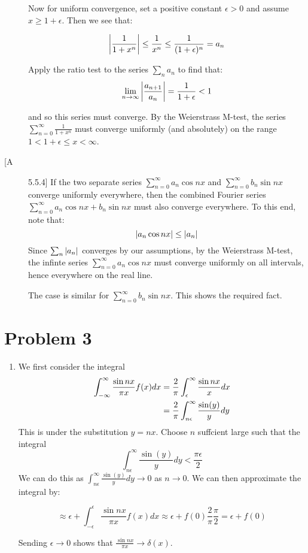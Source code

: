 \documentclass[12pt]{article}%
\newcommand{\infsum}[1][0]{\sum^{\infty}_{n = {#1}}}
\newcommand{\posinfint}[1][0]{\int_{#1}^\infty}
\begin{document}
\begin{description}
  Now for uniform convergence, set a positive constant $\epsilon > 0$ and assume $x \geq 1 + \epsilon$. Then we see that:

  \begin{equation*}
    \abs{\frac{1}{1 + x^n}} \leq \frac{1}{x^n} \leq \frac{1}{(1 + \epsilon)^n} = a_n
  \end{equation*}

  Apply the ratio test to the series $\sum_n a_n$ to find that:
  \begin{equation*}
    \lim_{n \rightarrow \infty} \abs{\frac{a_{n+1}}{a_n}} = \frac{1}{1  + \epsilon} < 1
  \end{equation*}

  and so this series must converge. By the Weierstrass M-test, the series $\infsum \frac{1}{1 + x^n}$ must converge uniformly (and absolutely) on the range $1 < 1 + \epsilon \leq x < \infty$.

  \item[[A] 5.5.4]
  If the two separate series $\infsum[0] a_n \cos{nx}$ and $\infsum b_n \sin{nx}$ converge uniformly everywhere, then the combined Fourier series $\infsum[0] a_n \cos{nx} + b_n \sin{nx}$ must also converge everywhere. To this end, note that: \[ \abs{a_n \cos{nx}} \leq \abs{a_n} \] Since $\sum_n \abs{a_n}$ converges by our assumptions, by the Weierstrass M-test, the infinte series $\infsum[0] a_n \cos{nx}$ must converge uniformly on all intervals, hence everywhere on the real line.

  The case is similar for $\infsum b_n \sin{nx}$. This shows the required fact.

\end{description}

\section{Problem 3}
\begin{enumerate}
  \item We first consider the integral
  \begin{align*}
    \doubinfint \frac{\sin{nx}}{\pi x} f(x) dx
    & = \frac{2}{\pi} \posinfint[\epsilon] \frac{\sin{nx}}{x} dx \\
    & = \frac{2}{\pi} \posinfint[n\epsilon] \frac{\sin(y)}{y} dy
  \end{align*}
  This is under the substitution $y = n x$. Choose $n$ suffcient large such that the integral
  \[\posinfint[n\epsilon] \frac{\sin(y)}{y} dy < \frac{\pi \epsilon}{2}\]
  We can do this as $\posinfint[n\epsilon] \frac{\sin(y)}{y} dy \rightarrow 0$ as $n \rightarrow 0$.
  We can then approximate the integral by:

 \[ \approx \epsilon + \int_{-\epsilon}^{\epsilon} \frac{\sin{nx}}{\pi x} f(x) dx \approx \epsilon + f(0) \frac{2}{\pi}\frac{\pi}{2} =  \epsilon + f(0)\]

 Sending $\epsilon \rightarrow 0$ shows that $\frac{\sin{nx}}{\pi x} \rightarrow \delta(x)$.

\end{enumerate}
\end{document}
